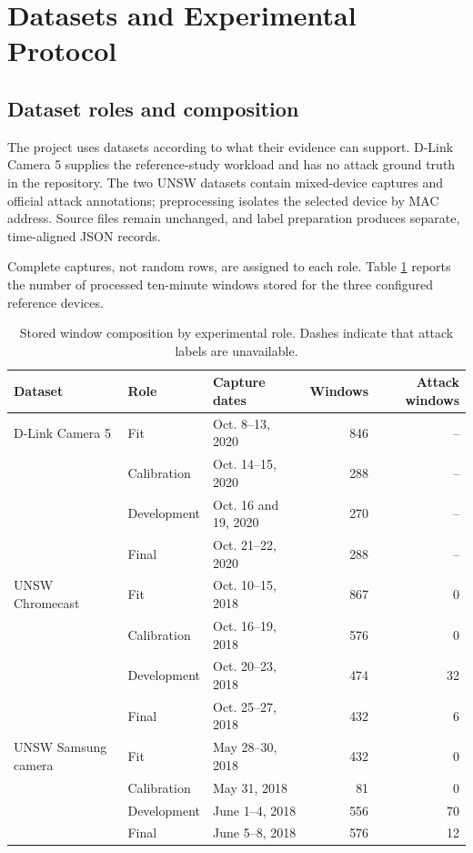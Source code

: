 \section{Datasets and Experimental Protocol}

\subsection{Dataset roles and composition}

The project uses datasets according to what their evidence can support. D-Link
Camera 5 supplies the reference-study workload and has no attack ground truth in
the repository. The two UNSW datasets contain mixed-device captures and official
attack annotations; preprocessing isolates the selected device by MAC address.
Source files remain unchanged, and label preparation produces separate,
time-aligned JSON records.

Complete captures, not random rows, are assigned to each role. Table
\ref{tab:dataset-composition} reports the number of processed ten-minute windows
stored for the three configured reference devices.

\begin{table}[H]
\centering
\small
\begin{tabularx}{\textwidth}{>{\raggedright\arraybackslash}p{}
>{\raggedright\arraybackslash}p{} X rr}
\toprule
\textbf{Dataset} & \textbf{Role} & \textbf{Capture dates} & \textbf{Windows}
& \textbf{Attack windows} \\
\midrule
D-Link Camera 5 & Fit & Oct. 8--13, 2020 & 846 & -- \\
{} & Calibration & Oct. 14--15, 2020 & 288 & -- \\
{} & Development & Oct. 16 and 19, 2020 & 270 & -- \\
{} & Final & Oct. 21--22, 2020 & 288 & -- \\
\midrule
UNSW Chromecast & Fit & Oct. 10--15, 2018 & 867 & 0 \\
{} & Calibration & Oct. 16--19, 2018 & 576 & 0 \\
{} & Development & Oct. 20--23, 2018 & 474 & 32 \\
{} & Final & Oct. 25--27, 2018 & 432 & 6 \\
\midrule
UNSW Samsung camera & Fit & May 28--30, 2018 & 432 & 0 \\
{} & Calibration & May 31, 2018 & 81 & 0 \\
{} & Development & June 1--4, 2018 & 556 & 70 \\
{} & Final & June 5--8, 2018 & 576 & 12 \\
\bottomrule
\end{tabularx}
\caption{Stored window composition by experimental role. Dashes indicate that
attack labels are unavailable.}
\label{tab:dataset-composition}
\end{table}

